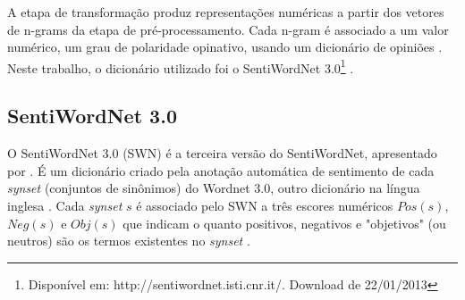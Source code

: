 
A etapa de transformação produz representações numéricas a partir dos vetores de n-grams da etapa de pré-processamento. Cada n-gram é associado a um valor numérico, um grau de polaridade opinativo, usando um dicionário de opiniões \cite{ballhysa2012fuzzy, moraes2012document, mouthami2013sentiment}. Neste trabalho, o dicionário utilizado foi o SentiWordNet 3.0\footnote{Disponível em: http://sentiwordnet.isti.cnr.it/. Download de 22/01/2013} \cite{baccianella2010sentiwordnet}.

\subsection{SentiWordNet 3.0}

O SentiWordNet 3.0 (SWN) é a terceira versão do SentiWordNet, apresentado por \cite{esuli2006sentiwordnet}. É um dicionário criado pela anotação automática de sentimento de cada \textit{synset} (conjuntos de sinônimos) do Wordnet 3.0, outro dicionário na língua inglesa \cite{fellbaum2005wordnet}. Cada \textit{synset} $s$ é associado pelo SWN a três  escores numéricos $Pos(s)$, $Neg(s)$ e $Obj(s)$ que indicam o quanto positivos, negativos e "objetivos" (ou neutros) são os termos existentes no \textit{synset} \cite{baccianella2010sentiwordnet}. 

